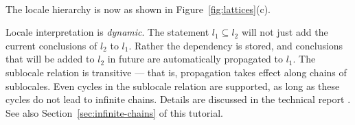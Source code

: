 \begin{isabellebody}
\isanewline
\ \ \isamarkupfalse%
%
\endisatagproof
{\isafoldproof}%
%
\isadelimproof
%
\endisadelimproof
%
\begin{isamarkuptext}%
The locale hierarchy is now as shown in
  Figure~\ref{fig:lattices}(c).%
\end{isamarkuptext}%
\isamarkuptrue%
%
\begin{isamarkuptext}%
Locale interpretation is \emph{dynamic}.  The statement
   $l_1 \subseteq l_2$ will not just add the
  current conclusions of $l_2$ to $l_1$.  Rather the dependency is
  stored, and conclusions that will be
  added to $l_2$ in future are automatically propagated to $l_1$.
  The sublocale relation is transitive --- that is, propagation takes
  effect along chains of sublocales.  Even cycles in the sublocale relation are
  supported, as long as these cycles do not lead to infinite chains.
  Details are discussed in the technical report \cite{Ballarin2006a}.
  See also Section~\ref{sec:infinite-chains} of this tutorial.%
\end{isamarkuptext}%
\isamarkuptrue%
%
\isadelimtheory
%
\endisadelimtheory
%
\isatagtheory
{}\isamarkupfalse%
%
\endisatagtheory
{\isafoldtheory}%
%
\isadelimtheory
%
\endisadelimtheory
\isanewline
\end{isabellebody}%
